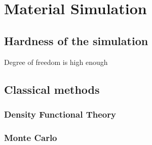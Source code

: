 \chapter{Material Simulation}

\section{Hardness of the simulation}

Degree of freedom is high enough

\section{Classical methods}

\subsection{Density Functional Theory}

\subsection{Monte Carlo}

